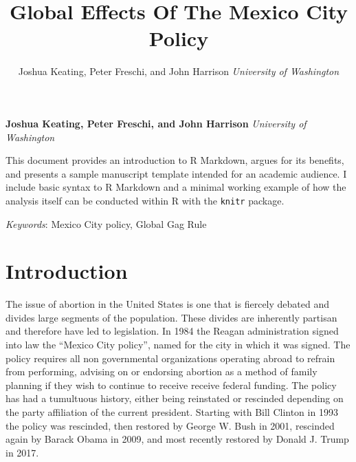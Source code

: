 \documentclass[11pt,]{article}
\title{Global Effects Of The Mexico City Policy  }
\author{\Large Joshua Keating, Peter Freschi, and John Harrison\vspace{0.05in} \newline\normalsize\emph{University of Washington}  }
\date{}
\newcommand*{\authorfont}{\fontfamily{phv}\selectfont}
\renewenvironment{abstract}
 {{%
    \setlength{\leftmargin}{0mm}
    \setlength{\rightmargin}{\leftmargin}%
  }%
  \relax}
 {\endlist}
\begin{document}
	
%

{%
\setlength{\parindent}{0pt}
\thispagestyle{plain}
{\fontsize{18}{20}\selectfont\raggedright 
\maketitle  %

}

{
   \vskip 13.5pt\relax \normalsize\fontsize{11}{12} 
\textbf{\authorfont Joshua Keating, Peter Freschi, and John Harrison} \hskip 15pt \emph{\small University of Washington}   

}

}







\begin{abstract}

    \hbox{\vrule height .2pt width 39.14pc}

    \vskip 8.5pt %

\noindent This document provides an introduction to R Markdown, argues for its
benefits, and presents a sample manuscript template intended for an
academic audience. I include basic syntax to R Markdown and a minimal
working example of how the analysis itself can be conducted within R
with the \texttt{knitr} package.


\vskip 8.5pt \noindent \emph{Keywords}: Mexico City policy, Global Gag Rule \par

    \hbox{\vrule height .2pt width 39.14pc}



\end{abstract}


\vskip 6.5pt

\noindent  \section{Introduction}\label{introduction}

The issue of abortion in the United States is one that is fiercely
debated and divides large segments of the population. These divides are
inherently partisan and therefore have led to legislation. In 1984 the
Reagan administration signed into law the ``Mexico City policy'', named
for the city in which it was signed. The policy requires all non
governmental organizations operating abroad to refrain from performing,
advising on or endorsing abortion as a method of family planning if they
wish to continue to receive receive federal funding. The policy has had
a tumultuous history, either being reinstated or rescinded depending on
the party affiliation of the current president. Starting with Bill
Clinton in 1993 the policy was rescinded, then restored by George W.
Bush in 2001, rescinded again by Barack Obama in 2009, and most recently
restored by Donald J. Trump in 2017.
\end{document}
